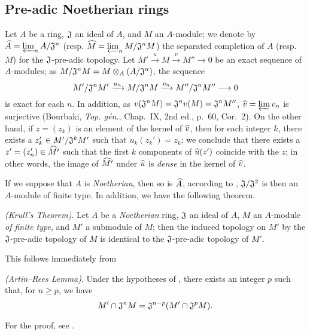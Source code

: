 \subsection{Pre-adic Noetherian rings}
\label{subsection-pre-adic-noetherian-rings}

\begin{env}[7.3.1]
\label{0.7.3.1}
Let $A$ be a ring, $\mathfrak{J}$ an ideal of $A$, and $M$ an $A$-module; we denote by
$\widehat{A}=\varprojlim_n A/\mathfrak{J}^n$
(resp. $\widehat{M}=\varprojlim_n M/\mathfrak{J}^n M$) the separated completion of $A$
(resp. $M$) for the $\mathfrak{J}$-pre-adic topology. Let
$M'\xrightarrow{u}M\xrightarrow{v}M''\to 0$ be an exact sequence of $A$-modules; as
$M/\mathfrak{J}^n M=M\otimes_A(A/\mathfrak{J}^n)$, the sequence
\[
  M'/\fk{J}^n M'\xrightarrow{u_n}M/\fk{J}^n M\xrightarrow{v_n}M''/\fk{J}^n M''\to 0
\]
is exact for each $n$. In addition, as
$v(\mathfrak{J}^n M)=\mathfrak{J}^n v(M)=\mathfrak{J}^n M''$,
$\widehat{v}=\varprojlim v_n$ is surjective (Bourbaki, \emph{Top. g\'en.}, Chap.~IX,
2nd ed., p.~60, Cor.~2). On the other hand, if $z=(z_k)$ is an element of the kernel of
$\widehat{v}$, then for each integer $k$, there exists a $z_k'\in M'/\mathfrak{J}^k M'$
such that $u_k(z_k')=z_k$; we conclude that there exists  a $z'=(z_n')\in\widehat{M'}$
such that the first $k$ components of $\widehat{u}(z')$ coincide with the $z$; in other
words, the image of $\widehat{M'}$ under $\widehat{u}$ is \emph{dense} in the kernel of
$\widehat{v}$.

If we suppose that $A$ is \emph{Noetherian}, then so is $\widehat{A}$, according to
, $\mathfrak{J}/\mathfrak{J}^2$ is then an $A$-module of
finite type. In addition, we have the following theorem.
\end{env}

\begin{thm}[7.3.2]
\label{0.7.3.2}
\emph{(Krull's Theorem)}. Let $A$ be a \emph{Noetherian} ring, $\mathfrak{J}$ an ideal of
$A$, $M$ an $A$-module \emph{of finite type}, and $M'$ a submodule of $M$; then the induced
topology on $M'$ by the $\mathfrak{J}$-pre-adic topology of $M$ is identical to the
$\mathfrak{J}$-pre-adic topology of $M'$.
\end{thm}

This follows immediately from
\begin{lem}[7.3.2.1]
\label{0.7.3.2.1}
\emph{(Artin--Rees Lemma)}. Under the hypotheses of , there
exists an integer $p$ such that, for $n\geqslant p$, we have
\[
  M'\cap\mathfrak{J}^n M=\mathfrak{J}^{n-p}(M'\cap\mathfrak{J}^p M).
\]
\end{lem}

For the proof, see \cite[p.~2--04]{I-1}.

